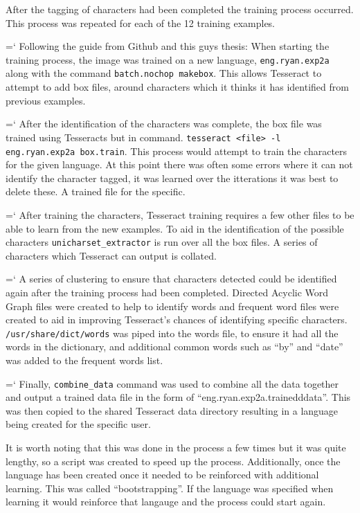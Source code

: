 {After the tagging of characters had been completed the training process occurred. This process was repeated for each of the 12 training examples.

{{\ttfamily \hyphenchar\the\font=`\-}%
Following the guide from Github and this guys thesis:
When starting the training process, the image was trained on a new language, \texttt{eng.ryan.exp2a} along with the command \texttt{batch.nochop makebox}. This allows Tesseract to attempt to add box files, around characters which it thinks it has identified from previous examples.

{{\ttfamily \hyphenchar\the\font=`\-}%
After the identification of the characters was complete, the box file was trained using Tesseracts but in command. \texttt{tesseract <file> -l eng.ryan.exp2a box.train}. This process would attempt to train the characters for the given language. At this point there was often some errors where it can not identify the character tagged, it was learned over the itterations it was best to delete these. A trained file for the specific.

{{\ttfamily \hyphenchar\the\font=`\-}%
After training the characters, Tesseract training requires a few other files to be able to learn from the new examples. To aid in the identification of the possible characters \texttt{unicharset\_extractor} is run over all the box files. A series of characters which Tesseract can output is collated.

{{\ttfamily \hyphenchar\the\font=`\-}%
A series of clustering to ensure that characters detected could be identified again after the training process had been completed. Directed Acyclic Word Graph files were created to help to identify words and frequent word files were created to aid in improving Tesseract's chances of identifying specific characters. \texttt{/usr/share/dict/words} was piped into the words file, to ensure it had all the words in the dictionary, and additional common words such as ``by'' and ``date'' was added to the frequent words list.

{{\ttfamily \hyphenchar\the\font=`\-}%
Finally, \texttt{combine\_data} command was used to combine all the data together and output a trained data file in the form of ``eng.ryan.exp2a.trainedddata''. This was then copied to the shared Tesseract data directory resulting in a language being created for the specific user.

It is worth noting that this was done in the process a few times but it was quite lengthy, so a script was created to speed up the process. Additionally, once the language has been created once it needed to be reinforced with additional learning. This was called ``bootstrapping''. If the language was specified when learning it would reinforce that langauge and the process could start again.


}}}}}}

